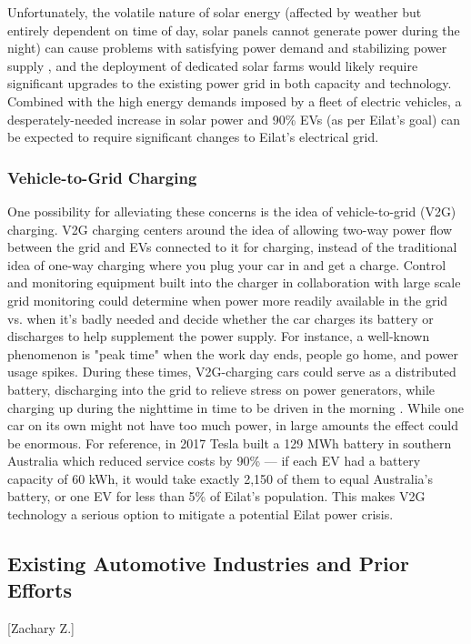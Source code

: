 \documentclass{article}                         %
\begin{document}
Unfortunately, the volatile nature of solar energy (affected by weather but entirely dependent on time of day, solar panels cannot generate power during the night) can cause problems with satisfying power demand and stabilizing power supply \cite{Lu2015IntroductionPEVs}, and the deployment of dedicated solar farms would likely require significant upgrades to the existing power grid \cite{Vardimon2011AssessmentIsrael} in both capacity and technology. Combined with the high energy demands imposed by a fleet of electric vehicles, a desperately-needed increase in solar power and 90\% EVs (as per Eilat's goal) can be expected to require significant changes to Eilat's electrical grid.

\subsubsection{Vehicle-to-Grid Charging}
One possibility for alleviating these concerns is the idea of vehicle-to-grid (V2G) charging. V2G charging centers around the idea of allowing two-way power flow between the grid and EVs connected to it for charging, instead of the traditional idea of one-way charging where you plug your car in and get a charge. Control and monitoring equipment built into the charger in collaboration with large scale grid monitoring could determine when power more readily available in the grid vs. when it's badly needed and decide whether the car charges its battery or discharges to help supplement the power supply. For instance, a well-known phenomenon is "peak time" when the work day ends, people go home, and power usage spikes. During these times, V2G-charging cars could serve as a distributed battery, discharging into the grid to relieve stress on power generators, while charging up during the nighttime in time to be driven in the morning \cite{Mahmud2015PowerEV}. While one car on its own might not have too much power, in large amounts the effect could be enormous. For reference, in 2017 Tesla built a 129 MWh battery in southern Australia which reduced service costs by 90\% \cite{Lambert2018Teslas90} --- if each EV had a battery capacity of 60 kWh, it would take exactly 2,150 of them to equal Australia's battery, or one EV for less than 5\% of Eilat's population. This makes V2G technology a serious option to mitigate a potential Eilat power crisis.

\subsection{Existing Automotive Industries and Prior Efforts}[Zachary Z.]
\end{document}

